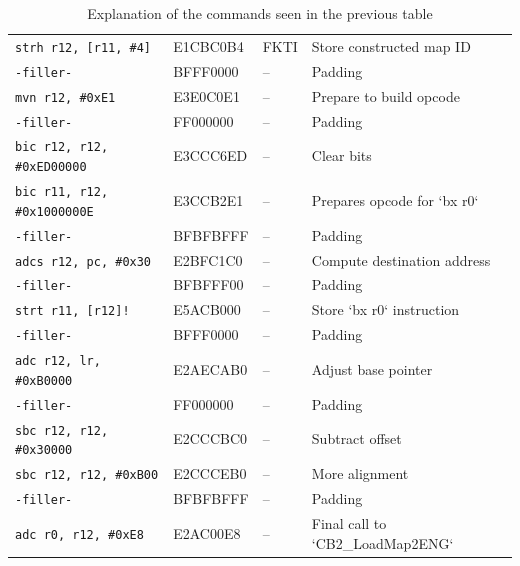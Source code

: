 \documentclass[a4paper]{usiinfbachelorproject}
\begin{document}
\begin{table}[htbp]
\begin{tabular}{|l|l|l|p{6cm}|}
		\texttt{strh r12, [r11, \#4]}       & E1CBC0B4              & FKTI                    & Store constructed map ID           \\
		\texttt{-filler-}                   & BFFF0000              & --                      & Padding                            \\
		\texttt{mvn r12, \#0xE1}            & E3E0C0E1              & --                      & Prepare to build opcode            \\
		\texttt{-filler-}                   & FF000000              & --                      & Padding                            \\
		\texttt{bic r12, r12, \#0xED00000}  & E3CCC6ED              & --                      & Clear bits                         \\
		\texttt{bic r11, r12, \#0x1000000E} & E3CCB2E1              & --                      & Prepares opcode for `bx r0`        \\
		\texttt{-filler-}                   & BFBFBFFF              & --                      & Padding                            \\
		\texttt{adcs r12, pc, \#0x30}       & E2BFC1C0              & --                      & Compute destination address        \\
		\texttt{-filler-}                   & BFBFFF00              & --                      & Padding                            \\
		\texttt{strt r11, [r12]!}           & E5ACB000              & --                      & Store `bx r0` instruction          \\
		\texttt{-filler-}                   & BFFF0000              & --                      & Padding                            \\
		\texttt{adc r12, lr, \#0xB0000}     & E2AECAB0              & --                      & Adjust base pointer                \\
		\texttt{-filler-}                   & FF000000              & --                      & Padding                            \\
		\texttt{sbc r12, r12, \#0x30000}    & E2CCCBC0              & --                      & Subtract offset                    \\
		\texttt{sbc r12, r12, \#0xB00}      & E2CCCEB0              & --                      & More alignment                     \\
		\texttt{-filler-}                   & BFBFBFFF              & --                      & Padding                            \\
		\texttt{adc r0, r12, \#0xE8}        & E2AC00E8              & --                      & Final call to `CB2\_LoadMap2ENG`   \\
		\hline
	\end{tabular}

	\caption{Explanation of the commands seen in the previous table}
	\label{tab:boxes_names_explanation}
\end{table}
\end{document}
